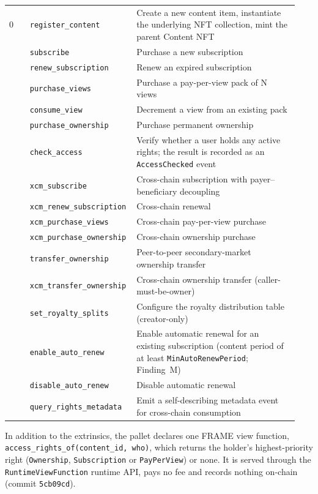 \begin{longtable}{@{}L{0.07\linewidth} L{0.32\linewidth} L{0.55\linewidth}@{}}
0 & \texttt{register\_content} & Create a new content item, instantiate the underlying NFT collection, mint the parent Content NFT \\
 & \texttt{subscribe} & Purchase a new subscription \\
 & \texttt{renew\_subscription} & Renew an expired subscription \\
 & \texttt{purchase\_views} & Purchase a pay-per-view pack of N views \\
 & \texttt{consume\_view} & Decrement a view from an existing pack \\
 & \texttt{purchase\_ownership} & Purchase permanent ownership \\
 & \texttt{check\_access} & Verify whether a user holds any active rights; the result is recorded as an \texttt{AccessChecked} event \\
 & \texttt{xcm\_subscribe} & Cross-chain subscription with payer--beneficiary decoupling \\
 & \texttt{xcm\_renew\_subscription} & Cross-chain renewal \\
 & \texttt{xcm\_purchase\_views} & Cross-chain pay-per-view purchase \\
 & \texttt{xcm\_purchase\_ownership} & Cross-chain ownership purchase \\
 & \texttt{transfer\_ownership} & Peer-to-peer secondary-market ownership transfer \\
 & \texttt{xcm\_transfer\_ownership} & Cross-chain ownership transfer (caller-must-be-owner) \\
 & \texttt{set\_royalty\_splits} & Configure the royalty distribution table (creator-only) \\
 & \texttt{enable\_auto\_renew} & Enable automatic renewal for an existing subscription (content period of at least \texttt{MinAutoRenewPeriod}; Finding~M) \\
 & \texttt{disable\_auto\_renew} & Disable automatic renewal \\
 & \texttt{query\_rights\_metadata} & Emit a self-describing metadata event for cross-chain consumption \\
\end{longtable}

In addition to the extrinsics, the pallet declares one FRAME view function, \texttt{access\_rights\_of(content\_id, who)}, which returns the holder's highest-priority right (\texttt{Ownership}, \texttt{Subscription} or \texttt{PayPerView}) or none. It is served through the \texttt{RuntimeViewFunction} runtime API, pays no fee and records nothing on-chain (commit \texttt{5cb09cd}).

